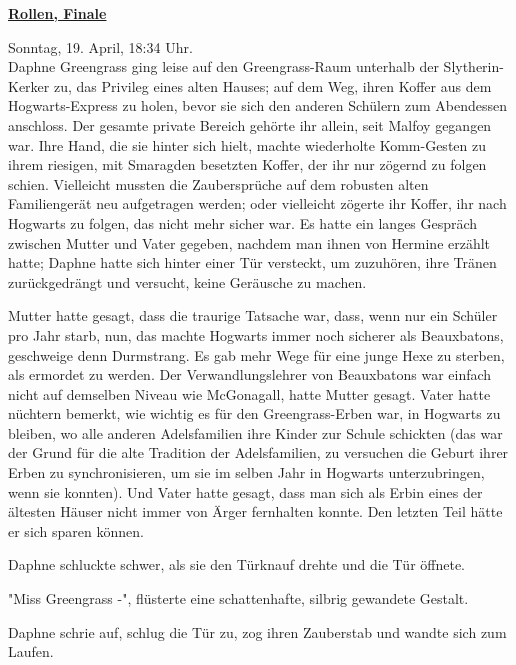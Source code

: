 

\hypertarget{rollen-finale}{%

\textbf{\uline{Rollen, Finale}}

Sonntag, 19. April, 18:34 Uhr.\\ Daphne Greengrass ging leise auf den Greengrass-Raum unterhalb der Slytherin-Kerker zu, das Privileg eines alten Hauses; auf dem Weg, ihren Koffer aus dem Hogwarts-Express zu holen, bevor sie sich den anderen Schülern zum Abendessen anschloss. Der gesamte private Bereich gehörte ihr allein, seit Malfoy gegangen war. Ihre Hand, die sie hinter sich hielt, machte wiederholte Komm-Gesten zu ihrem riesigen, mit Smaragden besetzten Koffer, der ihr nur zögernd zu folgen schien. Vielleicht mussten die Zaubersprüche auf dem robusten alten Familiengerät neu aufgetragen werden; oder vielleicht zögerte ihr Koffer, ihr nach Hogwarts zu folgen, das nicht mehr sicher war. Es hatte ein langes Gespräch zwischen Mutter und Vater gegeben, nachdem man ihnen von Hermine erzählt hatte; Daphne hatte sich hinter einer Tür versteckt, um zuzuhören, ihre Tränen zurückgedrängt und versucht, keine Geräusche zu machen.

Mutter hatte gesagt, dass die traurige Tatsache war, dass, wenn nur ein Schüler pro Jahr starb, nun, das machte Hogwarts immer noch sicherer als Beauxbatons, geschweige denn Durmstrang. Es gab mehr Wege für eine junge Hexe zu sterben, als ermordet zu werden. Der Verwandlungslehrer von Beauxbatons war einfach nicht auf demselben Niveau wie McGonagall, hatte Mutter gesagt. Vater hatte nüchtern bemerkt, wie wichtig es für den Greengrass-Erben war, in Hogwarts zu bleiben, wo alle anderen Adelsfamilien ihre Kinder zur Schule schickten (das war der Grund für die alte Tradition der Adelsfamilien, zu versuchen die Geburt ihrer Erben zu synchronisieren, um sie im selben Jahr in Hogwarts unterzubringen, wenn sie konnten). Und Vater hatte gesagt, dass man sich als Erbin eines der ältesten Häuser nicht immer von Ärger fernhalten konnte. Den letzten Teil hätte er sich sparen können.

Daphne schluckte schwer, als sie den Türknauf drehte und die Tür öffnete.

"Miss Greengrass -", flüsterte eine schattenhafte, silbrig gewandete Gestalt.

Daphne schrie auf, schlug die Tür zu, zog ihren Zauberstab und wandte sich zum Laufen.

}
